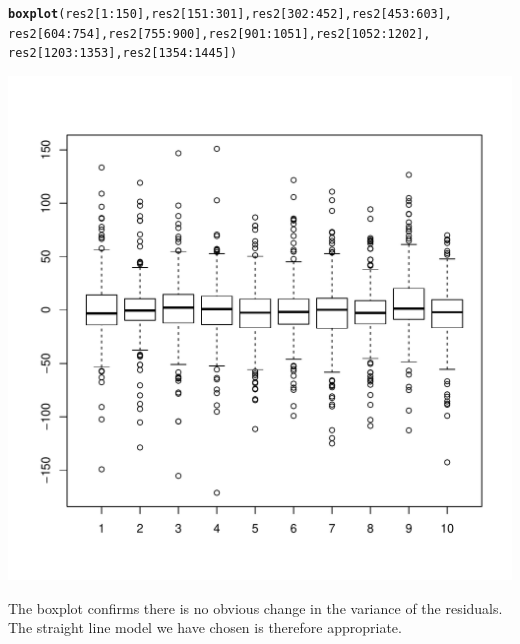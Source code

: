 \documentclass{article}\usepackage[]{graphicx}\usepackage[]{color}
\makeatletter
\def\maxwidth{ %
  \ifdim\Gin@nat@width>\linewidth
    \linewidth
  \else
    \Gin@nat@width
  \fi
}
\newcommand{\hlnum}[1]{\textcolor[rgb]{0.686,0.059,0.569}{#1}}%
\newcommand{\hlopt}[1]{\textcolor[rgb]{0,0,0}{#1}}%
\newcommand{\hlstd}[1]{\textcolor[rgb]{0.345,0.345,0.345}{#1}}%
\newcommand{\hlkwd}[1]{\textcolor[rgb]{0.737,0.353,0.396}{\textbf{#1}}}%
\newenvironment{kframe}{%
 \def\at@end@of@kframe{}%
 \ifinner\ifhmode%
  \def\at@end@of@kframe{\end{minipage}}%
  \begin{minipage}{\columnwidth}%
 \fi\fi%
 \def\FrameCommand##1{\hskip\@totalleftmargin \hskip-\fboxsep
 \colorbox{shadecolor}{##1}\hskip-\fboxsep
     \hskip-\linewidth \hskip-\@totalleftmargin \hskip\columnwidth}%
 \MakeFramed {\advance\hsize-\width
   \@totalleftmargin\z@ \linewidth\hsize
   \@setminipage}}%
 {\par\unskip\endMakeFramed%
 \at@end@of@kframe}
\newenvironment{knitrout}{}{} %
\makeatother
\begin{document}
\clearpage
\begin{knitrout}
\color{fgcolor}\begin{kframe}
\begin{alltt}
\hlkwd{boxplot}\hlstd{(res2[}\hlnum{1}\hlopt{:}\hlnum{150}\hlstd{],res2[}\hlnum{151}\hlopt{:}\hlnum{301}\hlstd{],res2[}\hlnum{302}\hlopt{:}\hlnum{452}\hlstd{],res2[}\hlnum{453}\hlopt{:}\hlnum{603}\hlstd{],}
        \hlstd{res2[}\hlnum{604}\hlopt{:}\hlnum{754}\hlstd{],res2[}\hlnum{755}\hlopt{:}\hlnum{900}\hlstd{],res2[}\hlnum{901}\hlopt{:}\hlnum{1051}\hlstd{],res2[}\hlnum{1052}\hlopt{:}\hlnum{1202}\hlstd{],}
        \hlstd{res2[}\hlnum{1203}\hlopt{:}\hlnum{1353}\hlstd{],res2[}\hlnum{1354}\hlopt{:}\hlnum{1445}\hlstd{])}
\end{alltt}
\end{kframe}
\includegraphics[width=\maxwidth]{figure/unnamed-chunk-6-1} 

\end{knitrout}

The boxplot confirms there is no obvious change in the variance of the residuals. The straight line model we have chosen is therefore appropriate.

\clearpage
\end{document}
